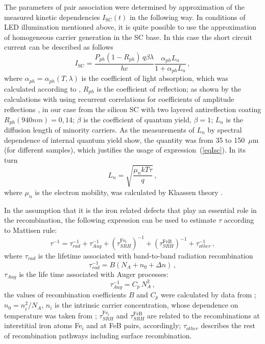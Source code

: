 \documentclass[sn-mathphys]{sn-jnl}%
\theoremstyle{thmstyleone}%
\theoremstyle{thmstyletwo}%
\theoremstyle{thmstylethree}%
\begin{document}
The parameters of pair association were determined by approximation of the measured kinetic
dependencies $I_\mathrm{SC}(t)$ in the following way.
In conditions of LED illumination mentioned above,
it is quite possible to use the approximation of homogeneous carrier generation in the SC base.
In this case the short circuit current can be described as follows \cite{Bube,Razeghi}
\begin{equation}
\label{eqIsc}
I_\mathrm{SC}=\frac{P_{ph}(1-R_{ph})\,q\beta\lambda}{hc}\frac{\alpha_{ph}L_n}{1+\alpha_{ph}L_n}\,,
\end{equation}
where
$\alpha_{ph}=\alpha_{ph}(T,\lambda)$ is the coefficient of light absorption,
which was calculated according to \cite{Si:Absorb,GreenOptic},
$R_{ph}$ is the coefficient of reflection;
as shown by the calculations with using recurrent correlations for coefficients of amplitude reflections \cite{KostRefl2000,KostRefl2000A},
in our case from the silicon SC with two layered antireflection coating $R_{ph}(940 nm)=0,14$;
$\beta$ is the coefficient of quantum  yield, $\beta=1$;
$L_n$  is the diffusion length of minority carriers.
As the measurements of $L_n$ by spectral dependence of internal quantum yield show,
the quantity was from 35 to 150~$\mu$m (for different samples),
which justifies the usage of expression~(\ref{eqIsc}).
In its turn
\begin{equation}
\label{eqLn}
L_n=\sqrt{\frac{\mu_nkT\tau}{q}}\,,
\end{equation}
where
$\mu_n$ is the electron mobility, was calculated by Klaassen theory \cite{KLAASSEN953}.

In the assumption that it is the iron related defects that play an essential role in the recombination,
the following expression can be used to estimate $\tau$ according to Mattisen rule:
\begin{equation}
\label{eqTau}
\tau^{-1}=\tau_{rad}^{-1}+\tau_{Aug}^{-1}+(\tau_{SRH}^{\mathrm{Fe_i}})^{-1}
+(\tau_{SRH}^\mathrm{FeB})^{-1}+\tau_{other}^{-1}\,,
\end{equation}
where
$\tau_{rad}$ is the lifetime associated with band-to-band radiation recombination
\begin{equation}
\label{eqTauRad}
\tau_{rad}^{-1}=B(N_A+n_0+\Delta n)\,,
\end{equation}
$\tau_{Aug}$ is the life time associated with Auger processes:
\begin{equation}
\label{eqTauAug}
\tau_{Aug}^{-1}=C_p\,N_A^2\,,
\end{equation}
the values of recombination coefficients $B$ and $C_p$ were calculated by data from \cite{Si_BtB,Si_Auger};
$n_0=n_i^2/N_A$,
$n_i$ is the intrinsic carrier concentration, whose dependence on temperature was taken from \cite{Si_ni_Couderc};
$\tau_{SRH}^{\mathrm{Fe_i}}$  and $\tau_{SRH}^\mathrm{FeB}$ are related to the recombinations at interstitial iron atoms Fe$_i$ and at FeB pairs, accordingly;
$\tau_{other}$ describes the rest of recombination pathways including surface recombination.
\end{document}
